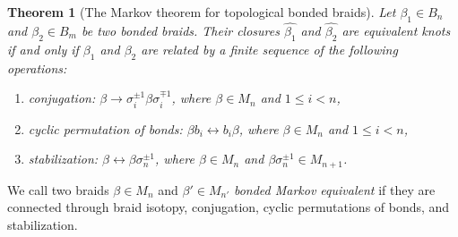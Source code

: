 \documentclass{article}
\theoremstyle{definition}
\theoremstyle{plain}
\newtheorem{theorem}{Theorem}[section]
\theoremstyle{remark}
\begin{document}
\begin{theorem}[The Markov theorem for topological bonded braids]
    Let $\beta_1 \in B_n$ and $\beta_2 \in B_m$ be two bonded braids.
    Their closures $\hat{\beta_1}$ and $\hat{\beta_2}$  are equivalent knots if and only if  $\beta_1$ and $\beta_2$ are related by a finite sequence of the following operations:
    \begin{enumerate}
    \item conjugation: $\beta \rightarrow \sigma_i^{\pm 1} \beta \sigma_i^{\mp 1}$, where $\beta \in M_n$ and $1 \leq i < n$,
    \item cyclic permutation of bonds: $\beta b_i \leftrightarrow b_i \beta$, where $\beta \in M_n$ and $1 \leq i < n$,
    \item stabilization: $\beta \leftrightarrow \beta \sigma_n^{\pm 1}$, where $\beta \in M_n$ and $\beta \sigma_n^{\pm 1} \in M_{n+1}$. 
    \end{enumerate}
\end{theorem}

We call two braids $\beta \in M_n$ and $\beta' \in M_{n'}$ \emph{bonded Markov equivalent} if they are connected through braid isotopy, conjugation, cyclic permutations of bonds, and stabilization.
\end{document}
